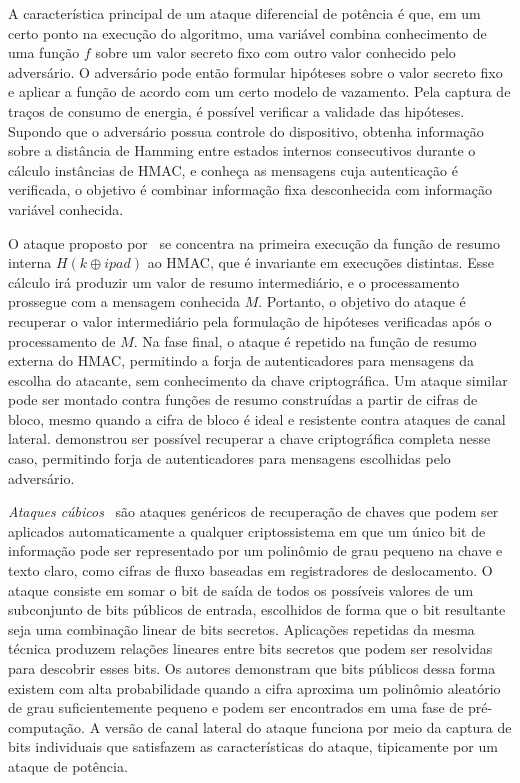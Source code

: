 \documentclass{SBCbookchapter}
\begin{document}
A característica principal de um ataque diferencial de potência é que, em um certo ponto na execução do algoritmo,
uma variável combina conhecimento de uma função $f$ sobre um valor secreto fixo com outro valor conhecido pelo adversário.
O adversário pode então formular hipóteses sobre o valor secreto fixo e aplicar a função de acordo com um certo modelo de vazamento.
Pela captura de traços de consumo de energia, é possível verificar a validade das hipóteses.
Supondo que o adversário possua controle do dispositivo, obtenha  informação sobre a distância de Hamming entre estados internos consecutivos
durante o cálculo instâncias de HMAC, e conheça as mensagens cuja autenticação é verificada, o objetivo é combinar informação fixa desconhecida
com informação variável conhecida.

O ataque proposto por~\cite{McEvoyTMM07} se concentra na primeira execução da função de resumo interna $H(k \oplus ipad)$ ao HMAC, que é invariante em execuções distintas. Esse cálculo irá produzir um valor de resumo intermediário, e o processamento prossegue com a mensagem conhecida $M$.
Portanto, o objetivo do ataque é recuperar o valor intermediário pela formulação de hipóteses verificadas após o processamento de $M$.
Na fase final, o ataque é repetido na função de resumo externa do HMAC, permitindo a forja de autenticadores para mensagens da escolha do atacante,
sem conhecimento da chave criptográfica. Um ataque similar pode ser montado contra funções de resumo construídas a partir de cifras de bloco,
mesmo quando a cifra de bloco é ideal e resistente contra ataques de canal lateral. \cite{Okeya06} demonstrou ser possível recuperar
a chave criptográfica completa nesse caso, permitindo forja de autenticadores para mensagens escolhidas pelo adversário.

\emph{Ataques cúbicos}~\cite{DinurS12} são ataques genéricos de recuperação de chaves que podem ser aplicados automaticamente
a qualquer criptossistema em que um único bit de informação pode ser representado por um polinômio de grau
pequeno na chave e texto claro, como cifras de fluxo baseadas em registradores de deslocamento.
O ataque consiste em somar o bit de saída de todos os possíveis valores de um subconjunto de bits públicos de entrada,
escolhidos de forma que o bit resultante seja uma combinação linear de bits secretos. Aplicações repetidas da mesma técnica produzem
relações lineares entre bits secretos que podem ser resolvidas para descobrir esses bits.
Os autores demonstram que bits públicos dessa forma existem com alta probabilidade quando a cifra aproxima um polinômio aleatório de grau suficientemente pequeno
e podem ser encontrados em uma fase de pré-computação. A versão de canal lateral do ataque funciona por meio da captura de bits individuais que satisfazem
as características do ataque, tipicamente por um ataque de potência.
\end{document}

